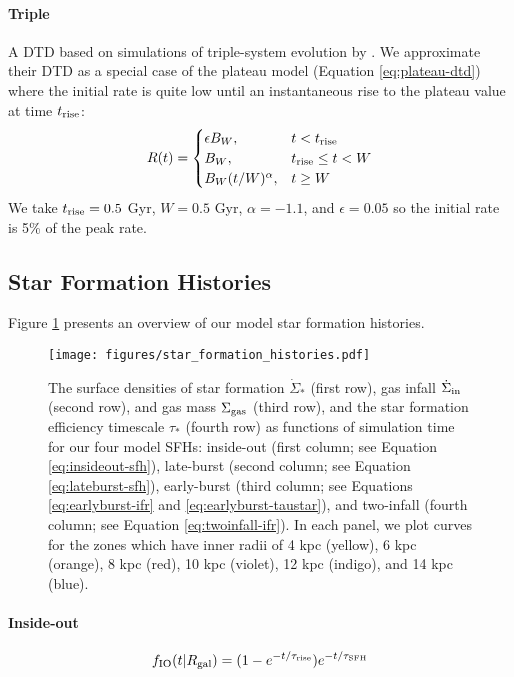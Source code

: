 \documentclass[twocolumn,linenumbers,twocolappendix]{aastex631}
\begin{document}
\paragraph{Triple} A DTD based on simulations of triple-system evolution by \citet{Rajamuthukumar2022-TripleEvolution}. We approximate their DTD as a special case of the plateau model (Equation \ref{eq:plateau-dtd}) where the initial rate is quite low until an instantaneous rise to the plateau value at time $t_{\rm rise}$:
\begin{equation}
    R(t) = 
    \begin{cases}
        \epsilon B_W, & t < t_{\rm rise} \\
        B_W, & t_{\rm rise} \leq t < W \\
        B_W (t / W) ^ \alpha, & t \geq W
    \end{cases}
    \label{eq:triple-dtd}
\end{equation}
We take $t_{\rm rise}=0.5$ Gyr, $W=0.5$ Gyr, $\alpha=-1.1$, and $\epsilon=0.05$ so the initial rate is 5\% of the peak rate.

\subsection{Star Formation Histories}
\label{sec:sfh}

Figure \ref{fig:sfhs} presents an overview of our model star formation histories.

\begin{figure*}
    \centering
    \texttt{[image: figures/star\_formation\_histories.pdf]}
    \caption{The surface densities of star formation $\dot \Sigma_*$ (first row), gas infall $\dot \Sigma_{\rm in}$ (second row), and gas mass $\Sigma_{\rm gas}$ (third row), and the star formation efficiency timescale $\tau_*$ (fourth row) as functions of simulation time for our four model SFHs: inside-out (first column; see Equation \ref{eq:insideout-sfh}), late-burst (second column; see Equation \ref{eq:lateburst-sfh}), early-burst (third column; see Equations \ref{eq:earlyburst-ifr} and \ref{eq:earlyburst-taustar}), and two-infall (fourth column; see Equation \ref{eq:twoinfall-ifr}). In each panel, we plot curves for the zones which have inner radii of 4 kpc (yellow), 6 kpc (orange), 8 kpc (red), 10 kpc (violet), 12 kpc (indigo), and 14 kpc (blue).}
    \label{fig:sfhs}
\end{figure*}

\paragraph{Inside-out}
\begin{equation}
    f_{\rm IO}(t|R_{\rm gal}) = (1 - e^{-t/\tau_{\rm rise}}) e^{-t/\tau_{\rm SFH}}
    \label{eq:insideout-sfh}
\end{equation}
\end{document}
